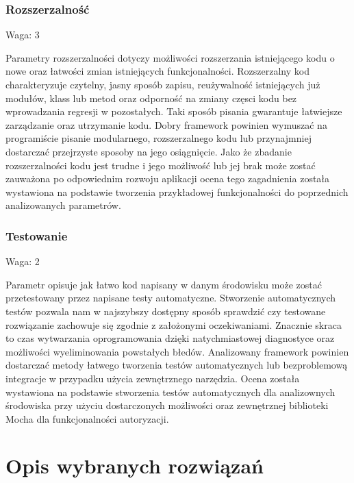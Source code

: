 \documentclass[12pt]{report}
\begin{document}
    \subsection{Rozszerzalność}
      \begin{description}
        \item Waga: 3
      \end{description}
      Parametry rozszerzalności dotyczy możliwości rozszerzania istniejącego kodu o nowe oraz łatwości zmian istniejących funkcjonalności.
      Rozszerzalny kod charakteryzuje czytelny, jasny sposób zapisu, reużywalność istniejących już modułów, klass lub metod oraz odporność na zmiany częsci kodu bez wprowadzania regresji w pozostałych.
      Taki sposób pisania gwarantuje łatwiejsze zarządzanie oraz utrzymanie kodu.
      Dobry framework powinien wymuszać na programiście pisanie modularnego, rozszerzalnego kodu lub przynajmniej dostarczać przejrzyste sposoby na jego osiągnięcie.
      Jako że zbadanie rozszerzalności kodu jest trudne i jego możliwość lub jej brak może zostać zauważona po odpowiednim rozwoju aplikacji ocena tego zagadnienia została wystawiona na podstawie tworzenia przykładowej funkcjonalności do poprzednich analizowanych parametrów.

    \subsection{Testowanie}
      \begin{description}
        \item Waga: 2
      \end{description}
      Parametr opisuje jak łatwo kod napisany w danym środowisku może zostać przetestowany przez napisane testy automatyczne.
      Stworzenie automatycznych testów pozwala nam w najszybszy dostępny sposób sprawdzić czy testowane rozwiązanie zachowuje się zgodnie z założonymi oczekiwaniami.
      Znacznie skraca to czas wytwarzania oprogramowania dzięki natychmiastowej diagnostyce oraz możliwości wyeliminowania powstałych błedów.
      Analizowany framework powinien dostarczać metody łatwego tworzenia testów automatycznych lub bezproblemową integracje w przypadku użycia zewnętrznego narzędzia.
      Ocena została wystawiona na podstawie stworzenia testów automatycznych dla analizownych środowiska przy użyciu dostarczonych możliwości oraz zewnętrznej biblioteki Mocha dla funkcjonalności autoryzacji.

\chapter{Opis wybranych rozwiązań}
\end{document}
